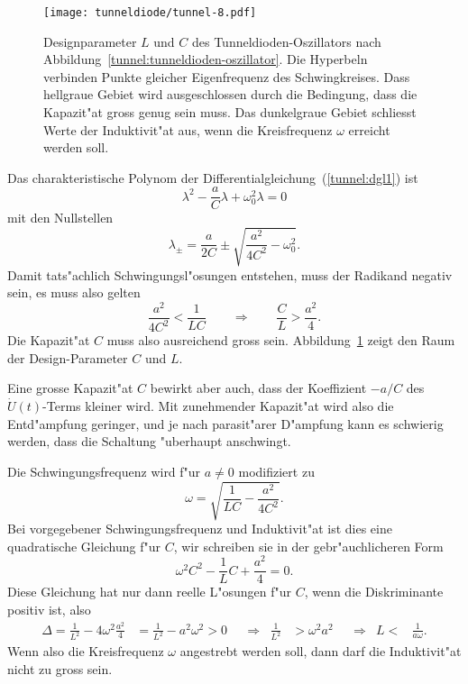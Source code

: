 \begin{figure}
\centering
\texttt{[image: tunneldiode/tunnel-8.pdf]}
\caption{Designparameter $L$ und $C$ des Tunneldioden-Oszillators nach
Abbildung~\ref{tunnel:tunneldioden-oszillator}. 
Die Hyperbeln verbinden Punkte gleicher Eigenfrequenz des Schwingkreises.
Dass hellgraue Gebiet wird ausgeschlossen durch die Bedingung, dass die
Kapazit"at gross genug sein muss.
Das dunkelgraue Gebiet schliesst Werte der Induktivit"at aus, wenn die
Kreisfrequenz $\omega$ erreicht werden soll.
\label{tunnel:designparameter}}
\end{figure}

Das charakteristische Polynom der Differentialgleichung~(\ref{tunnel:dgl1})
ist
\[
\lambda^2-\frac{a}{C}\lambda +\omega_0^2\lambda=0
\]
mit den Nullstellen
\[
\lambda_\pm = \frac{a}{2C}\pm\sqrt{\frac{a^2}{4C^2}-\omega_0^2}.
\]
Damit tats"achlich Schwingungsl"osungen entstehen, muss der Radikand
negativ sein, es muss also gelten
\[
\frac{a^2}{4C^2}<\frac1{LC}
\qquad\Rightarrow\qquad
\frac{C}{L} > \frac{a^2}{4}.
\]
Die Kapazit"at $C$ muss also ausreichend gross sein.
Abbildung~\ref{tunnel:designparameter} zeigt den Raum der Design-Parameter
$C$ und $L$.

Eine grosse Kapazit"at $C$ bewirkt aber auch, dass der Koeffizient
$-a/C$ des $\dot U(t)$-Terms kleiner wird. Mit zunehmender Kapazit"at
wird also die Entd"ampfung geringer, und je nach parasit"arer D"ampfung
kann es schwierig werden, dass die Schaltung "uberhaupt anschwingt.

Die Schwingungsfrequenz wird f"ur $a\ne 0$ modifiziert zu
\begin{equation}
\omega
=
\sqrt{
\frac{1}{LC}
-
\frac{a^2}{4C^2}
}.
\label{tunnel:oszillatorfrequenz}
\end{equation}
Bei vorgegebener Schwingungsfrequenz und Induktivit"at ist dies eine
quadratische Gleichung f"ur $C$, wir schreiben sie in der gebr"auchlicheren
Form
\begin{equation}
\omega^2 C^2 -\frac1{L}C+\frac{a^2}{4}=0.
\label{tunnel:qgleichung}
\end{equation}
Diese Gleichung hat nur dann reelle L"osungen f"ur $C$, wenn die Diskriminante
positiv ist, also
\begin{equation}
\begin{aligned}
\Delta=
\frac1{L^2}-4\omega^2\frac{a^2}4&
=\frac1{L^2}-a^2\omega^2
>0
&
&\Rightarrow&
\frac1{L^2}&>\omega^2a^2
&
&\Rightarrow&
L<&\frac1{a\omega}.
\end{aligned}
\end{equation}
Wenn also die Kreisfrequenz $\omega$ angestrebt werden soll, dann darf die
Induktivit"at nicht zu gross sein.

